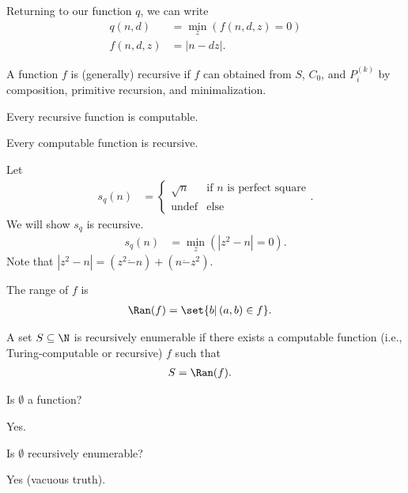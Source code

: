 \documentclass[10pt]{mypackage}
\begin{document}
\begin{example}
  Returning to our function $q$, we can write
  \begin{align*}
    q\left(n,d\right) &= \min_{z}\left(f\left(n,d,z\right) = 0\right)\\
    f\left(n,d,z\right) &= \left\vert n-dz \right\vert.
  \end{align*}
\end{example}
\begin{definition}
  A function $f$ is (generally) recursive if $f$ can obtained from $S$, $C_0$, and $P_{i}^{(k)}$ by composition, primitive recursion, and minimalization.
\end{definition}
\begin{theorem}
  Every recursive function is computable.
\end{theorem}
\begin{theorem}
  Every computable function is recursive.
\end{theorem}
\begin{example}
  Let
  \begin{align*}
    s_q\left(n\right) &= \begin{cases}
      \sqrt{n} & \text{if $n$ is perfect square}\\
      \text{undef} & \text{else}
    \end{cases}.
  \end{align*}
  We will show $s_q$ is recursive.
  \begin{align*}
    s_q\left(n\right) &= \min_{z}\left(\left\vert z^2 - n \right\vert = 0\right).
  \end{align*}
  Note that $\left\vert z^2 - n \right\vert = \left(z^2 \dot{-} n\right) + \left(n\dot{-} z^2\right)$.
\end{example}
\begin{definition}[]
  The range of $f$ is
  \begin{align*}
    \Ran(f) &= \set{b | \left(a,b\right)\in f}.
  \end{align*}
\end{definition}
\begin{definition}
  A set $S\subseteq \N$ is recursively enumerable if there exists a computable function (i.e., Turing-computable or recursive) $f$ such that
  \begin{align*}
    S &= \Ran(f).
  \end{align*}
\end{definition}
\begin{question}
  Is $\emptyset$ a function?
\begin{answer}
  Yes.
\end{answer}
Is $\emptyset$ recursively enumerable?
\begin{answer}
  Yes (vacuous truth).
\end{answer}
\end{question}
\end{document}
